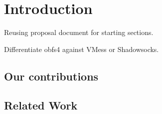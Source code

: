 \chapter{Introduction}\label{ch:intorduction}

Reusing proposal document for starting sections.

Differentiate obfs4 against VMess or Shadowsocks.

\section{Our contributions} \label{sec:contributions}

\section{Related Work} \label{sec:related-work}
